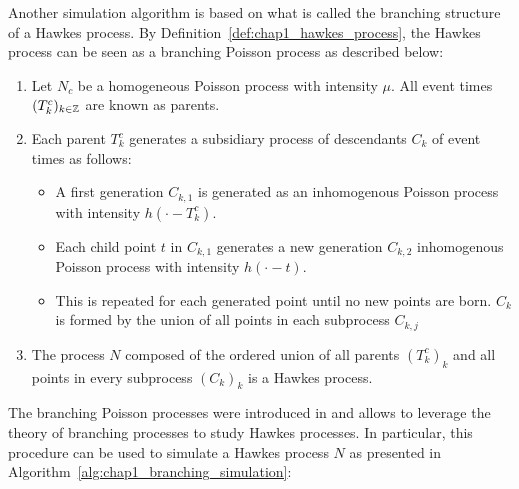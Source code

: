 Another simulation algorithm is based on what is called the branching structure of a Hawkes process.
By Definition~\ref{def:chap1_hawkes_process}, the Hawkes process can be seen as a branching Poisson process as described below:
\begin{enumerate}
    \item Let $N_c$ be a homogeneous Poisson process with intensity $\mu$. All event times $(T_k^c)_{k\in{\mathbb Z}}$ are known as parents.
    \item Each parent $T_k^c$ generates a subsidiary process of descendants $C_k$ of event times as follows:
    \begin{itemize}
        \item A first generation $C_{k,1}$ is generated as an inhomogenous Poisson process with intensity $h(\cdot - T_k^c)$.
        \item Each child point $t$ in $C_{k,1}$ generates a new generation $C_{k,2}$ inhomogenous Poisson process with intensity $h(\cdot - t)$.
        \item This is repeated for each generated point until no new points are born. 
        $C_k$ is formed by the union of all points in each subprocess $C_{k, j}$
    \end{itemize}
    \item The process $N$ composed of the ordered union of all parents $(T_k^c)_k$ and all points in every subprocess $(C_k)_{k}$ is a Hawkes process.
\end{enumerate}
The branching Poisson processes were introduced in \textcite{Lewis1969} and allows to leverage the theory of branching processes to study Hawkes processes.
In particular, this procedure can be used to simulate a Hawkes process $N$ as presented in Algorithm~\ref{alg:chap1_branching_simulation}:

